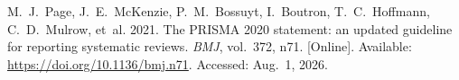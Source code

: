 {\begin{enumerate}[label={[\arabic*]}]


\item M.~J.~Page, J.~E.~McKenzie, P.~M.~Bossuyt, I.~Boutron, T.~C.~Hoffmann, C.~D.~Mulrow, et~al. 2021. The PRISMA 2020 statement: an updated guideline for reporting systematic reviews. \emph{BMJ}, vol.~372, n71. [Online]. Available: \url{https://doi.org/10.1136/bmj.n71}. Accessed: Aug.~1, 2026.






\end{enumerate}}
